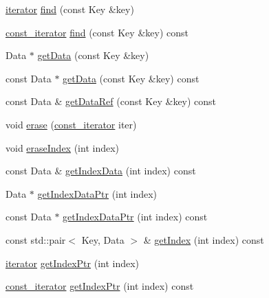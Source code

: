 \begin{CompactItemize}
\item 
\hyperlink{class_j_g_t_l_1_1_map_interface_a8fcdbd899d0df84ce1aaa67d8dc000e}{iterator} \hyperlink{class_j_g_t_l_1_1_map_interface_7e97b54c29a253bd99caf2b0decb95a8}{find} (const Key \&key)
\item 
\hyperlink{class_j_g_t_l_1_1_map_interface_bbce6cc516069a5a504e0ae5b9aecd88}{const\_\-iterator} \hyperlink{class_j_g_t_l_1_1_map_interface_4ec2d9323c3d2e65179c38ea7558a222}{find} (const Key \&key) const 
\item 
Data $\ast$ \hyperlink{class_j_g_t_l_1_1_map_interface_b18a78bcb6d8ebac123e934aaa3fad0b}{get\-Data} (const Key \&key)
\item 
const Data $\ast$ \hyperlink{class_j_g_t_l_1_1_map_interface_266cbd67bcff93d17649c35254d18190}{get\-Data} (const Key \&key) const 
\item 
const Data \& \hyperlink{class_j_g_t_l_1_1_map_interface_3613d63a8096f923e4e220e5aa002403}{get\-Data\-Ref} (const Key \&key) const 
\item 
void \hyperlink{class_j_g_t_l_1_1_map_interface_7fe23525fa2fca5e47cb047332fb49d3}{erase} (\hyperlink{class_j_g_t_l_1_1_map_interface_bbce6cc516069a5a504e0ae5b9aecd88}{const\_\-iterator} iter)
\item 
void \hyperlink{class_j_g_t_l_1_1_map_interface_8b9cf8f1daa77edaf645c22f81812fcf}{erase\-Index} (int index)
\item 
const Data \& \hyperlink{class_j_g_t_l_1_1_map_interface_3bd1eca8bba2b057e09eb6579e26ad8f}{get\-Index\-Data} (int index) const
\item 
Data $\ast$ \hyperlink{class_j_g_t_l_1_1_map_interface_e2b0ad1f3959cf7f8d1c6ef07c5a8c2c}{get\-Index\-Data\-Ptr} (int index)
\item 
const Data $\ast$ \hyperlink{class_j_g_t_l_1_1_map_interface_cbbfe062862b57f4e0027026f81562a9}{get\-Index\-Data\-Ptr} (int index) const
\item 
const std::pair$<$ Key, Data $>$ \& \hyperlink{class_j_g_t_l_1_1_map_interface_2fad30d3c69882b66d210539775db665}{get\-Index} (int index) const
\item 
\hyperlink{class_j_g_t_l_1_1_map_interface_a8fcdbd899d0df84ce1aaa67d8dc000e}{iterator} \hyperlink{class_j_g_t_l_1_1_map_interface_1d28999130a2279ae668715e90ae5529}{get\-Index\-Ptr} (int index)
\item 
\hyperlink{class_j_g_t_l_1_1_map_interface_bbce6cc516069a5a504e0ae5b9aecd88}{const\_\-iterator} \hyperlink{class_j_g_t_l_1_1_map_interface_f5cfdb7ca92b031a3ec4835c02a64d97}{get\-Index\-Ptr} (int index) const

\end{CompactItemize}
